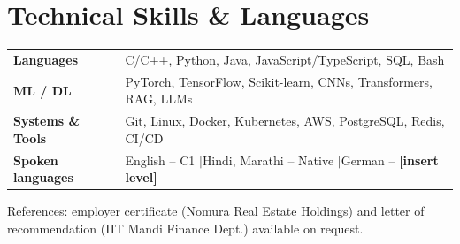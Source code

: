 \documentclass[a4paper,10pt]{article}
\begin{document}
\section{Technical Skills \& Languages}
\small
\begin{tabularx}{\linewidth}{@{}l X@{}}
\textbf{Languages} & C/C++, Python, Java, JavaScript/TypeScript, SQL, Bash \\
\textbf{ML / DL} & PyTorch, TensorFlow, Scikit-learn, CNNs, Transformers, RAG, LLMs \\
\textbf{Systems \& Tools} & Git, Linux, Docker, Kubernetes, AWS, PostgreSQL, Redis, CI/CD \\
\textbf{Spoken languages} & English -- C1 \quad$\vert$\quad Hindi, Marathi -- Native \quad$\vert$\quad German -- \textbf{[insert level]}
\end{tabularx}

\vspace{4pt}
{\small\color{gray} References: employer certificate (Nomura Real Estate Holdings) and letter of recommendation (IIT Mandi Finance Dept.) available on request.}
\end{document}
